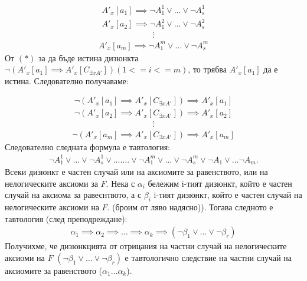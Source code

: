 \documentclass[french]{article}
\begin{document}
\begin{align*}
 A'_x[a_1] \implies \neg A_1^1 \lor  \dots \lor  \neg A_s^1
\end{align*}
\begin{align*}
A'_x[a_2] \implies \neg A_1^2 \lor  \dots \lor  \neg A_s^2
\end{align*}
\begin{align*}
\vdots
\end{align*}
\begin{align*}
A'_x[a_m] \implies \neg A_1^m \lor  \dots \lor  \neg A_s^m
\end{align*}
От $(*)$  за да бъде истина дизюнкта $\neg (A'_x[a_1] \implies A'_x[C_{\exists x A'}]) (1<=i<=m)$, то трябва $A'_x[a_1]$ да е истина. Следователно получаваме:

\begin{align*}
\neg (A'_x[a_1] \implies A'_x[C_{\exists x A'}]) \implies A'_x[a_1]
\end{align*}
\begin{align*}
\neg (A'_x[a_2] \implies A'_x[C_{\exists x A'}]) \implies A'_x[a_2]
\end{align*}
\begin{align*}
\vdots
\end{align*}
\begin{align*}
\neg (A'_x[a_m] \implies A'_x[C_{\exists x A'}]) \implies A'_x[a_m]
\end{align*}
Следователно следната формула е тавтология:
\begin{align*}
\neg A_1^1 \lor \dots \lor \neg A_s^1 \lor \dots \dots.  \lor \neg A_1^m \lor \dots \lor \neg A_s^m \lor \neg A_1 \lor \dots \neg A_m.
\end{align*}
Всеки дизюнкт е частен случай или на аксиомите за равенството, или на нелогическите аксиоми за $F$. Нека с $\alpha_i$ бележим i-тият дизюнкт, който е частен случай на аксиома за равеснтвото, а с $\beta_i$ i-тият дизюнкт, който е частен случай на нелогическите аксиоми на $F$. (броим от ляво надясно)). 
Тогава следното е тавтология (след преподреждане):
\begin{align*}
\alpha_1 \implies \alpha_2 \implies \dots \implies \alpha_k  \implies (\neg \beta_1 \lor \dots \lor \neg \beta_r) 
\end{align*}
Получихме, че дизюнкцията от отрицания на частни случай на нелогическите аксиоми на $F$ $(\neg \beta_1 \lor \dots \lor \neg \beta_r)$ е тавтологично следствие на частни случай на аксиомите за равенството ($\alpha_1 \dots \alpha_k$).
\end{document}
